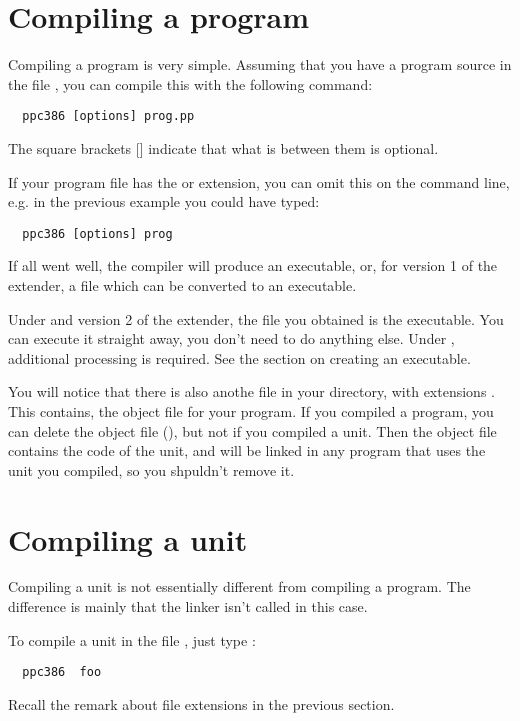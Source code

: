 \documentclass{report}
\begin{document}
\section{Compiling a program}
Compiling a program is very simple. Assuming that you have a program source
in the file , you can compile this with the following command:
\begin{verbatim}
  ppc386 [options] prog.pp
\end{verbatim}
The square brackets [] indicate that what is between them is optional. 

If your program file has the  or  extension, 
you can omit this on the command line, e.g. in the previous example you 
could have typed:
\begin{verbatim}
  ppc386 [options] prog
\end{verbatim}

If all went well, the compiler will produce an executable, or, for version 1
of the \dos extender, a file which can be converted to an executable.

Under \linux and version 2 of the \dos extender, the file you obtained is 
the executable. You can execute it straight away, you don't need to do 
anything else. Under \dos,
additional processing is required. See the section on creating an
executable.

You will notice that there is also anothe file in your directory, with
extensions . This contains, the object file for your program. 
If you compiled a program, you can delete the object file (), 
but not if you compiled a unit. 
Then the object file contains the code of the unit, and will be
linked in any program that uses the unit you compiled, so you shpuldn't
remove it.


\section{Compiling a unit}

Compiling a unit is not essentially different from compiling a program.
The difference is mainly that the linker isn't called in this case.

To compile a unit in the file , just type :
\begin{verbatim}
  ppc386  foo
\end{verbatim}
Recall the remark about file extensions in the previous section.
\end{document}
